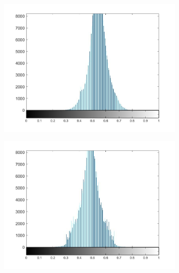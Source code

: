 \begin{figure}
\begin{subfigure}[b]{0.23\textwidth}
         \caption{}
         \label{fig:nss5}
     \end{subfigure}
     \begin{subfigure}[b]{0.23\textwidth}
         \centering
         \includegraphics[width=\textwidth]{./figs/mscn_histblur}
         \caption{}
         \label{fig:nss6}
     \end{subfigure}
     \begin{subfigure}[b]{0.23\textwidth}
         \centering
         \includegraphics[width=\textwidth]{./figs/mscn_histmblur}
         \caption{}
         \label{fig:nss7}
     \end{subfigure}
     \begin{subfigure}[b]{0.23\textwidth}

\end{subfigure}
\end{figure}
